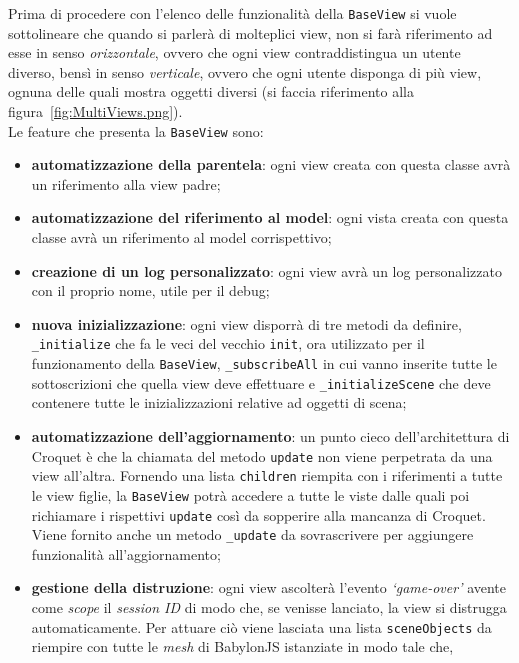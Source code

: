 Prima di procedere con l'elenco delle funzionalità della \texttt{BaseView} si vuole sottolineare che quando si parlerà di molteplici view, non si farà riferimento ad esse in senso
\textit{orizzontale}, ovvero che ogni view contraddistingua un utente diverso, bensì in senso \textit{verticale}, ovvero che ogni utente disponga di più view, ognuna delle quali mostra oggetti diversi (si faccia riferimento alla figura~\ref{fig:MultiViews.png}).\\
Le feature che presenta la \texttt{BaseView} sono:
\begin{itemize}
    \item \textbf{automatizzazione della parentela}: ogni view creata con questa classe avrà un riferimento alla view padre;
    \item \textbf{automatizzazione del riferimento al model}: ogni vista creata con questa classe avrà un riferimento al model corrispettivo;
    \item \textbf{creazione di un log personalizzato}: ogni view avrà un log personalizzato con il proprio nome, utile per il debug;
    \item \textbf{nuova inizializzazione}: ogni view disporrà di tre metodi da definire, \texttt{\_initialize} che fa le veci del vecchio \texttt{init}, ora utilizzato per il funzionamento
    della \texttt{BaseView}, \texttt{\_subscribeAll} in cui vanno inserite tutte le sottoscrizioni che quella view deve effettuare e \texttt{\_initializeScene} che deve contenere tutte le
    inizializzazioni relative ad oggetti di scena;
    \item \textbf{automatizzazione dell'aggiornamento}: un punto cieco dell'architettura di Croquet è che la chiamata del metodo \texttt{update} non viene perpetrata da una view all'altra.
    Fornendo una lista \texttt{children} riempita con i riferimenti a tutte le view figlie, la \texttt{BaseView} potrà accedere a tutte le viste dalle quali poi richiamare i rispettivi
    \texttt{update} così da sopperire alla mancanza di Croquet. Viene fornito anche un metodo \texttt{\_update} da sovrascrivere per aggiungere funzionalità all'aggiornamento;
    \item \textbf{gestione della distruzione}: ogni view ascolterà l'evento \textit{`game-over'} avente come \textit{scope} il \textit{session ID} di modo che, se venisse lanciato, la view
    si distrugga automaticamente. Per attuare ciò viene lasciata una lista \texttt{sceneObjects} da riempire con tutte le \textit{mesh} di BabylonJS istanziate in modo tale che,

\end{itemize}
